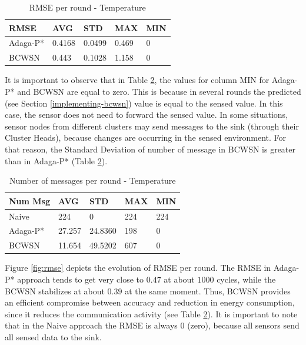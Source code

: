 \documentclass{acm_proc_article-sp}
\begin{document}
\begin{table}[h!]
\small
\caption{RMSE per round - Temperature}
\label{tab:rmse}
\begin{center}
\begin{tabular}{|l||l|l|l|l|}
\hline
RMSE &AVG &STD &MAX &MIN \\
\hline\hline
Adaga-P* &0.4168 &0.0499 &0.469 &0 \\
\hline
BCWSN &0.443 &0.1028 &1.158 &0 \\
\hline
\end{tabular}
\end{center}
\end{table}
\vspace*{-.3cm}

It is important to observe that in Table \ref{tab:num-msg}, the values for
column MIN for Adaga-P* and BCWSN are equal to zero. This is because in several
rounds the predicted (see Section \ref{implementing-bcwsn}) value is equal to
the sensed value. In this case, the sensor does not need to forward the sensed
value. In some situations, sensor nodes from different clusters may send 
messages to the sink (through their Cluster Heads), because changes are
occurring in the sensed environment. For that reason, the Standard Deviation of
number of message in BCWSN is greater than in Adaga-P* (Table
\ref{tab:num-msg}).
\vspace*{-.3cm}

\begin{table}[h!]
\small
\caption{Number of messages per round - Temperature}
\label{tab:num-msg}
\begin{center}
\begin{tabular}{|l||l|l|l|l|}
\hline
Num Msg &AVG &STD &MAX &MIN \\
\hline\hline
Naive &224 &0 &224 &224 \\
\hline
Adaga-P* &27.257 &24.8360 &198 &0 \\
\hline
BCWSN &11.654 &49.5202 &607 &0 \\
\hline
\end{tabular}
\end{center}
\end{table}
\vspace*{-.3cm}

Figure \ref{fig:rmse} depicts the evolution of RMSE per round. The RMSE in 
Adaga-P* approach tends to get very close to $0.47$ at about $1000$ cycles,
while the BCWSN stabilizes at about $0.39$ at the same moment. Thus, BCWSN
provides an efficient compromise between accuracy and reduction in energy
consumption, since it reduces the communication activity (see Table
\ref{tab:num-msg}). It is important to note that in the Naive approach the RMSE
is always 0 (zero), because all sensors send all sensed data to the sink.
\end{document}
